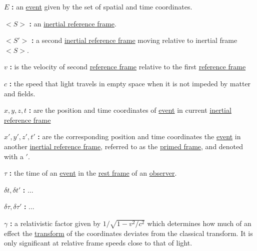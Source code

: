 \noindent ${E}$ \textbf{:}
an \hyperlink{def-event}{event} given by the set of spatial and time coordinates. %

\noindent ${<S>}$ \textbf{:}
an \hyperlink{def-Inertial-reference-frame}{inertial reference frame}.

\noindent ${<S'>}$ \textbf{:}
a second \hyperlink{def-Inertial-reference-frame}{inertial reference frame} moving relative to inertial frame ${<S>}$.

\noindent ${v}$ \textbf{:}
is the velocity of second \hyperlink{def-Reference-frame}{reference frame} relative to the first \hyperlink{def-Reference-frame}{reference frame}

\noindent ${c}$ \textbf{:}
the speed that light travels in empty space when it is not impeded by matter and fields.

\noindent ${x,y,z,t}$ \textbf{:}
are the position and time coordinates of \hyperlink{def-event}{event} in current \hyperlink{def-Inertial-reference-frame}{inertial reference frame}

\noindent ${x',y',z',t'}$ \textbf{:}
are the corresponding position and time coordinates the \hyperlink{def-event}{event} in another \hyperlink{def-Inertial-reference-frame}{inertial reference frame}, referred to as the \hyperlink{def-Primed-Frame}{primed frame}, and denoted with a ${'}$.

\noindent ${\tau}$ \textbf{:}
the time of an \hyperlink{def-event}{event} in the \hyperlink{def-proper-frame}{rest frame} of an \hyperlink{def-observer}{observer}.

\noindent ${\delta t,\delta t'}$ \textbf{:}
...

\noindent ${\delta \tau,\delta \tau'}$ \textbf{:}
...

\noindent ${\gamma}$ \textbf{:}
a relativistic factor given by ${1/\sqrt{1-v^2/c^2}}$ which determines how much of an effect the \hyperlink{def-transform}{transform} of the coordinates deviates from the classical transform. It is only significant at relative frame speeds close to that of light.
